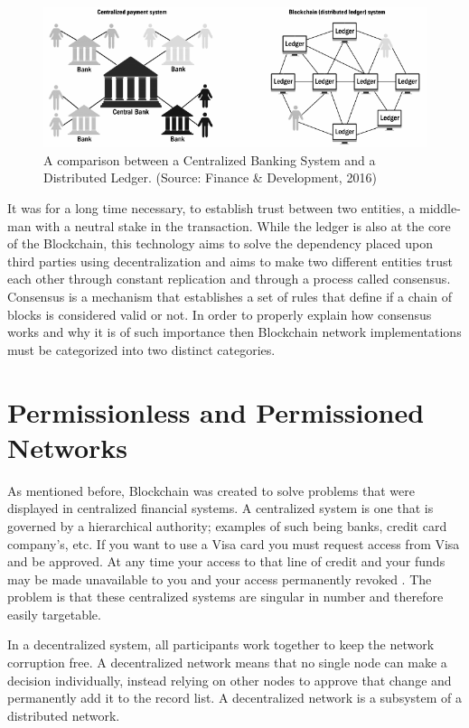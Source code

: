 \begin{figure}[h]
  \centering
  \includegraphics[width=1\linewidth]{imgs/blockchainvscentralizedNetwork.png}
  \caption{\label{fig:centralizedvsdescentralized} A comparison between a
  Centralized Banking System and a Distributed Ledger. (Source: Finance \&
  Development, 2016)}
\end{figure}

It was for a long time necessary, to establish trust between two entities, a
middle-man with a neutral stake in the transaction. While the ledger is also at
the core of the Blockchain, this technology aims to solve the dependency placed
upon third parties using decentralization and aims to make two different
entities trust each other through constant replication and through a process
called consensus.  Consensus is a mechanism that establishes a set of rules
that define if a chain of blocks is considered valid or not. In order to
properly explain how consensus works and why it is of such importance then
Blockchain network implementations must be categorized into two distinct
categories.

\section{Permissionless and Permissioned Networks}

As mentioned before, Blockchain was created to solve problems that were
displayed in centralized financial systems. A centralized system is one that is
governed by a hierarchical authority; examples of such being banks, credit card
company’s, etc. If you want to use a Visa card you must request access from
Visa and be approved. At any time your access to that line of credit and your
funds may be made unavailable to you and your access permanently revoked
\cite{Dreifuerst2018}. The problem is that these centralized systems are
singular in number and therefore easily targetable.

In a decentralized system, all participants work together to keep the network
corruption free. A decentralized network means that no single node can make a
decision individually, instead relying on other nodes to approve that change
and permanently add it to the record list. A decentralized network is a
subsystem of a distributed network.


